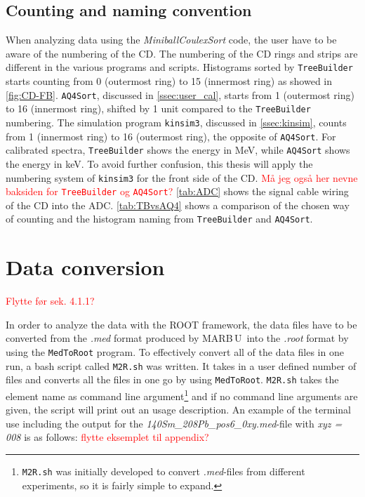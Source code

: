 \documentclass[twoside,english]{uiofysmaster/uiofysmaster}
\newcommand{\MBOU}{MAR\belowbaseline[-2pt]{a}B\stackinset{l}{3pt}{b}{-3pt}{O}{O}\,U}
\let\orgautoref\autoref
\renewcommand{\autoref}
        {%
		 \def\sectionautorefname{Section}%
		 \def\subsectionautorefname{Section}%
		 \def\subsubsectionautorefname{Section}%
		 \def\chapterautorefname{Chapter}%
          \orgautoref}
\begin{document}
\subsection{Counting and naming convention}

When analyzing data using the \textsl{MiniballCoulexSort} code, the user have to be aware of the numbering of the CD.
The numbering of the CD rings and strips are different in the various programs and scripts. 
Histograms sorted by \texttt{TreeBuilder} starts counting from 0 (outermost ring) to 15 (innermost ring) as showed in \autoref{fig:CD-FB}. 
\texttt{AQ4Sort}, discussed in \autoref{ssec:user_cal}, starts from 1 (outermost ring) to 16 (innermost ring), shifted by 1 unit compared to the \texttt{TreeBuilder} numbering.
The simulation program \texttt{kinsim3}, discussed in \autoref{ssec:kinsim}, counts from 1 (innermost ring) to 16 (outermost ring), the opposite of \texttt{AQ4Sort}. 
For calibrated spectra, \texttt{TreeBuilder} shows the energy in MeV, while \texttt{AQ4Sort} shows the energy in keV.
To avoid further confusion, this thesis will apply the numbering system of \texttt{kinsim3} for the front side of the CD.
\textcolor{red}{Må jeg også her nevne baksiden for \texttt{TreeBuilder} og \texttt{AQ4Sort}?}
\autoref{tab:ADC} shows the signal cable wiring of the CD into the ADC.
\autoref{tab:TBvsAQ4} shows a comparison of the chosen way of counting and the histogram naming from \texttt{TreeBuilder} and \texttt{AQ4Sort}.






\section{Data conversion}\label{sec:data_conversion}
\textcolor{red}{Flytte før sek. 4.1.1?}

In order to analyze the data with the ROOT framework, the data files have to be converted from the 
\textit{.med} format produced by \MBOU\ into the \textit{.root} format by using the \texttt{MedToRoot} program. 
To effectively convert all of the data files in one run, a bash script called \texttt{M2R.sh} was written.
It takes in a user defined number of files and converts all the files in one go by using \texttt{MedToRoot}.
\texttt{M2R.sh} takes the element name as command line argument\footnote{\texttt{M2R.sh} was initially developed to convert \textit{.med}-files from different experiments, so it is fairly simple to expand.} and if no command line arguments are given, the script will print out an usage description.
An example of the terminal use including the output for the \textit{140Sm\_208Pb\_pos6\_0xy.med}-file with \textit{xyz = 008} is as follows: \textcolor{red}{flytte eksemplet til appendix?}
\end{document}

